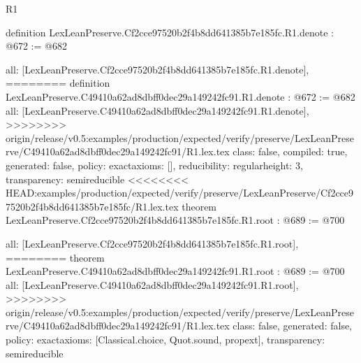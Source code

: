 \begin{lexlean}{R1}
\begin{coremodule}
{{{{{{definition LexLeanPreserve.Cf2cce97520b2f4b8dd641385b7e185fc.R1.denote : @672 := @682 {
  all: [LexLeanPreserve.Cf2cce97520b2f4b8dd641385b7e185fc.R1.denote],
========
definition LexLeanPreserve.C49410a62ad8dbff0dec29a149242fc91.R1.denote : @672 := @682 {
  all: [LexLeanPreserve.C49410a62ad8dbff0dec29a149242fc91.R1.denote],
>>>>>>>> origin/release/v0.5:examples/production/expected/verify/preserve/LexLeanPreserve/C49410a62ad8dbff0dec29a149242fc91/R1.lex.tex
  class: false,
  compiled: true,
  generated: false,
  policy: exact{axioms: []},
  reducibility: regular{height: 3},
  transparency: semireducible
}
<<<<<<<< HEAD:examples/production/expected/verify/preserve/LexLeanPreserve/Cf2cce97520b2f4b8dd641385b7e185fc/R1.lex.tex
theorem LexLeanPreserve.Cf2cce97520b2f4b8dd641385b7e185fc.R1.root : @689 := @700 {
  all: [LexLeanPreserve.Cf2cce97520b2f4b8dd641385b7e185fc.R1.root],
========
theorem LexLeanPreserve.C49410a62ad8dbff0dec29a149242fc91.R1.root : @689 := @700 {
  all: [LexLeanPreserve.C49410a62ad8dbff0dec29a149242fc91.R1.root],
>>>>>>>> origin/release/v0.5:examples/production/expected/verify/preserve/LexLeanPreserve/C49410a62ad8dbff0dec29a149242fc91/R1.lex.tex
  class: false,
  generated: false,
  policy: exact{axioms: [Classical.choice, Quot.sound, propext]},
  transparency: semireducible
}

}}}}}}}}
\end{coremodule}
\end{lexlean}
